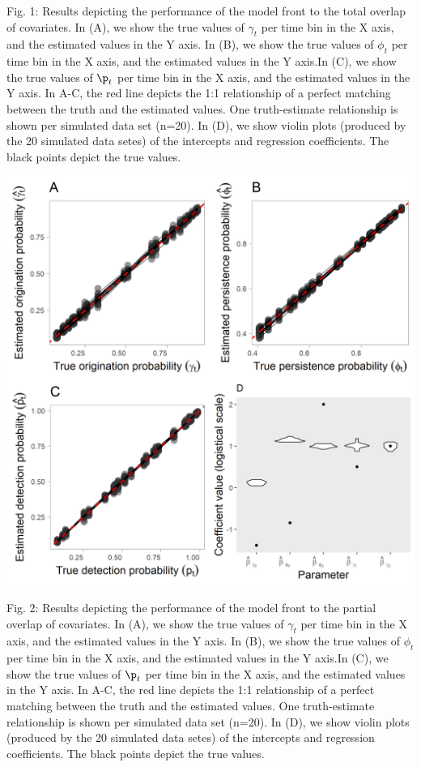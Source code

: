 \documentclass[
]{article}
\begin{document}
{Fig. 1: Results depicting the performance of the model front to the
total overlap of covariates. In (A), we show the true values of
\(\gamma_t\) per time bin in the X axis, and the estimated values in the
Y axis. In (B), we show the true values of \(\phi_t\) per time bin in
the X axis, and the estimated values in the Y axis.In (C), we show the
true values of \(\p_t\) per time bin in the X axis, and the estimated
values in the Y axis. In A-C, the red line depicts the 1:1 relationship
of a perfect matching between the truth and the estimated values. One
truth-estimate relationship is shown per simulated data set (n=20). In
(D), we show violin plots (produced by the 20 simulated data setes) of
the intercepts and regression coefficients. The black points depict the
true values.

\begin{center}\includegraphics[width=0.75\linewidth,height=0.75\textheight]{figs/sc2} \end{center}

Fig. 2: Results depicting the performance of the model front to the
partial overlap of covariates. In (A), we show the true values of
\(\gamma_t\) per time bin in the X axis, and the estimated values in the
Y axis. In (B), we show the true values of \(\phi_t\) per time bin in
the X axis, and the estimated values in the Y axis.In (C), we show the
true values of \(\p_t\) per time bin in the X axis, and the estimated
values in the Y axis. In A-C, the red line depicts the 1:1 relationship
of a perfect matching between the truth and the estimated values. One
truth-estimate relationship is shown per simulated data set (n=20). In
(D), we show violin plots (produced by the 20 simulated data setes) of
the intercepts and regression coefficients. The black points depict the
true values.

}
\end{document}

